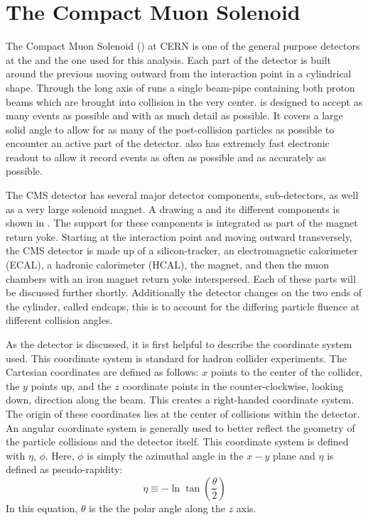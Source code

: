 \section{The Compact Muon Solenoid}
The Compact Muon Solenoid (\CMS) at CERN is one of the general purpose detectors at the \LHC and the one used for this analysis.  Each part of the detector is built around the previous moving outward from the interaction point in a cylindrical shape.  Through the long axis of \CMS runs a single beam-pipe containing both proton beams which are brought into collision in the very center. \CMS is designed to accept as many events as possible and with as much detail as possible.  It covers a large solid angle to allow for as many of the post-collision particles as possible to encounter an active part of the detector.  \CMS also has extremely fast electronic readout to allow it record events as often as possible and as accurately as possible.

The CMS detector has several major detector components, sub-detectors, as well as a very large solenoid magnet. A drawing a \CMS and its different components is shown in \cite{Sakuma_2014}. The support for these components is integrated as part of the magnet return yoke.  Starting at the interaction point and moving outward transversely, the CMS detector is made up of a silicon-tracker, an electromagnetic calorimeter (ECAL), a hadronic calorimeter (HCAL), the magnet, and then the muon chambers with an iron magnet return yoke interspersed.  Each of these parts will be discussed further shortly. Additionally the detector changes on the two ends of the cylinder, called endcaps, this is to account for the differing particle fluence at different collision angles.  

As the \CMS detector is discussed, it is first helpful to describe the coordinate system used.  This coordinate system is standard for hadron collider experiments.  The Cartesian coordinates are defined as follows: \ensuremath{x} points to the center of the collider, the \ensuremath{y} points up, and the \ensuremath{z} coordinate points in the counter-clockwise, looking down, direction along the beam.  This creates a right-handed coordinate system.  The origin of these coordinates lies at the center of collisions within the detector.  An angular coordinate system is generally used to better reflect the geometry of the particle collisions and the detector itself.  This coordinate system is defined with \ensuremath{\eta}, \ensuremath{\phi}.  Here, \ensuremath{\phi} is simply the azimuthal angle in the \ensuremath{x-y} plane and \ensuremath{\eta} is defined as pseudo-rapidity:
\begin{equation}
    \eta \equiv - \ln{
    \tan \left(\frac{\theta}{2}\right) }
    \label{eq:pseudorapidity}
\end{equation}
In this equation, \ensuremath{\theta} is the the polar angle along the \ensuremath{z} axis.

